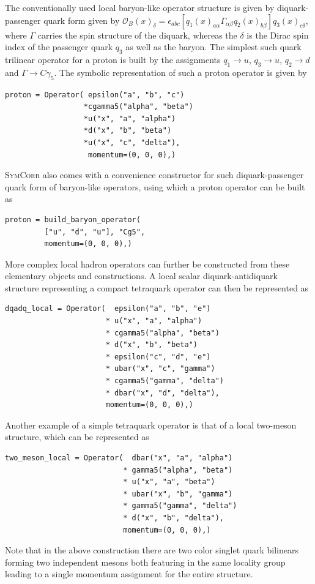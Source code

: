 \documentclass[a4paper,fleqn]{cas-dc}
\begin{document}
The conventionally used local baryon-like operator structure is given by diquark-passenger quark form given by $\mathcal O_B(x)_\delta=\epsilon_{abc}[q_1(x)_{a\alpha}\Gamma_{\alpha\beta}q_2(x)_{b\beta}]q_3(x)_{c\delta}$, where $\Gamma$ carries the spin structure of the diquark, whereas the $\delta$ is the Dirac spin index of the passenger quark $q_3$ as well as the baryon. The simplest such quark trilinear operator for a proton is built by the assignments $q_1\rightarrow u$, $q_3\rightarrow u$, $q_2\rightarrow d$ and $\Gamma\rightarrow C\gamma_5$. The symbolic representation of such a proton operator is given by 
\begin{verbatim}
proton = Operator( epsilon("a", "b", "c")
                  *cgamma5("alpha", "beta")
                  *u("x", "a", "alpha")
                  *d("x", "b", "beta")
                  *u("x", "c", "delta"),
                   momentum=(0, 0, 0),)
\end{verbatim}
\textsc{SymCorr} also comes with a convenience constructor for such diquark-passenger quark form of baryon-like operators, using which a proton operator can be built as 
\begin{verbatim}
proton = build_baryon_operator( 
         ["u", "d", "u"], "Cg5",
         momentum=(0, 0, 0),)
\end{verbatim}
More complex local hadron operators can further be constructed from these elementary objects and constructions. A local scalar diquark-antidiquark structure representing a compact tetraquark operator can then be represented as\\
\begin{verbatim}
dqadq_local = Operator(  epsilon("a", "b", "e") 
                       * u("x", "a", "alpha") 
                       * cgamma5("alpha", "beta") 
                       * d("x", "b", "beta")
                       * epsilon("c", "d", "e")
                       * ubar("x", "c", "gamma") 
                       * cgamma5("gamma", "delta") 
                       * dbar("x", "d", "delta"),
                       momentum=(0, 0, 0),)
\end{verbatim}
Another example of a simple tetraquark operator is that of a local two-meson structure, which can be represented as 
\begin{verbatim}
two_meson_local = Operator(  dbar("x", "a", "alpha")
                           * gamma5("alpha", "beta")
                           * u("x", "a", "beta")
                           * ubar("x", "b", "gamma")
                           * gamma5("gamma", "delta")
                           * d("x", "b", "delta"),
                           momentum=(0, 0, 0),)
\end{verbatim}
Note that in the above construction there are two color singlet quark bilinears forming two independent mesons both featuring in the same locality group leading to a single momentum assignment for the entire structure. 
\end{document}
